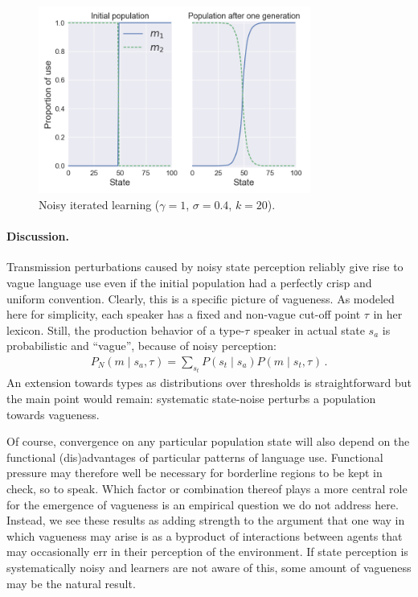 \documentclass[10pt,a4paper]{article}
\newcommand{\type}[1]{\ensuremath{\tau_{#1}}}
\newcommand{\postparameter}{\ensuremath{\gamma}}
\begin{document}
\begin{figure}[ht]
\centering
    \includegraphics[width=\textwidth,height=6.15cm, keepaspectratio]{../code/plots/vag-side-by-side.png}
\caption{Noisy iterated learning ($\postparameter=1$, $\sigma = 0.4$, $k = 20$).}
  \label{fig:vag}
\end{figure}
 
\paragraph{Discussion.}
Transmission perturbations caused by noisy state perception reliably give rise to vague
language use even if the initial population had a perfectly crisp and uniform
convention. Clearly, this is a specific picture of vagueness. As modeled here for simplicity,
each speaker has a fixed and non-vague cut-off point $\type{}$ in her lexicon. Still, the production
behavior of a type-$\type{}$ speaker in actual state $s_a$ is probabilistic and ``vague'', because of
noisy perception:
\begin{align*}
  P_N(m \mid s_a, \type{}) = \sum_{s_t} P(s_t \mid s_a) P(m \mid s_t, \type{})\,.
\end{align*}
An extension towards types as distributions over thresholds is straightforward but the main
point would remain: systematic state-noise perturbs a population towards vagueness. 

Of course, convergence on any particular population state will also depend on the functional
(dis)advantages of particular patterns of language use. Functional pressure may therefore well
be necessary for borderline regions to be kept in check, so to speak. Which factor or
combination thereof plays a more central role for the emergence of vagueness is an empirical
question we do not address here. Instead, we see these results as adding strength to the
argument that one way in which vagueness may arise is as a byproduct of interactions between
agents that may occasionally err in their perception of the environment. If state perception is
systematically noisy and learners are not aware of this, some amount of vagueness may be the
natural result.
\end{document}
